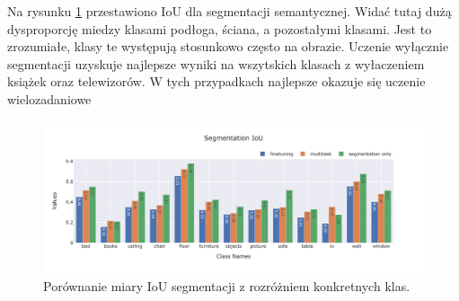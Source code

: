 Na rysunku \ref{fig:segmentation-iou} przestawiono IoU dla segmentacji semantycznej. Widać tutaj dużą dysproporcję miedzy klasami podłoga, ściana, a pozostałymi klasami. Jest to zrozumiałe, klasy te występują stosunkowo często na obrazie. Uczenie wyłącznie segmentacji uzyskuje najlepsze wyniki na wszytskich klasach z wyłaczeniem książek oraz telewizorów. W tych przypadkach najlepsze okazuje się uczenie wielozadaniowe
\begin{figure}[ht!]
    \centering
    \includegraphics[width=\textwidth]{result_imgs_sorted/Segmentation-IoU.jpeg}
    \caption{Porównanie miary IoU segmentacji z rozróżniem konkretnych klas.}
    \label{fig:segmentation-iou}
    
\end{figure}
    
    

